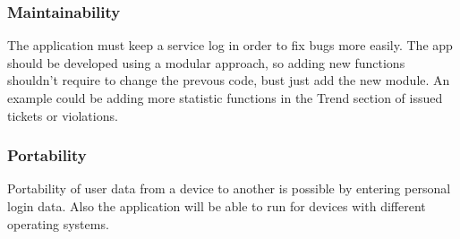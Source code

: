 \subsubsection{Maintainability}
The application must keep a service log in order to fix bugs more easily.
The app should be developed using a modular approach, so adding new functions shouldn't require to change the prevous code, bust just add the new module. An example could be adding more statistic functions in the Trend section of issued tickets or violations.

\subsubsection{Portability}
Portability of user data from a device to another is possible by entering personal login data. Also the application will be able to run for devices with different operating systems.
